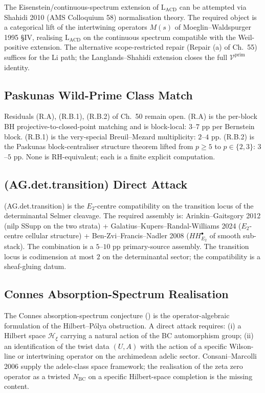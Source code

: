 The Eisenstein/continuous-spectrum extension of
\(\mathrm{L}_{\mathrm{ACD}}\) can be attempted via
Shahidi 2010 (AMS Colloquium 58) normalisation theory. The
required object is a categorical lift of the intertwining operators
\(M(s)\) of Moeglin--Waldspurger 1995 \S IV, realising
\(\mathrm{L}_{\mathrm{ACD}}\) on the continuous spectrum compatible
with the Weil-positive extension. The alternative scope-restricted
repair (Repair (a) of Ch.~55) suffices for the Li path; the
Langlands--Shahidi extension closes the full
\(\mathcal{V}^{\mathrm{prim}}\) identity.

\subsection{Paskunas Wild-Prime Class Match}
\label{v4-arith:w5-synth:paskunas-wild}

Residuals (R.A), (R.B.1), (R.B.2) of Ch.~50 remain open. (R.A) is
the per-block BH projective-to-closed-point matching and is
block-local: \(3\)--\(7\) pp per Bernstein block. (R.B.1) is the
very-special Breuil--Mezard multiplicity: \(2\)--\(4\) pp. (R.B.2) is
the Paskunas block-centraliser structure theorem lifted from
\(p\geq 5\) to \(p\in\{2,3\}\): \(3\)--\(5\) pp. None is RH-equivalent;
each is a finite explicit computation.

\subsection{(AG.det.transition) Direct Attack}
\label{v4-arith:w5-synth:AG-det-transition}

(AG.det.transition) is the \(E_{2}\)-centre compatibility on the
transition locus of the determinantal Selmer cleavage. The required
assembly is: Arinkin--Gaitsgory 2012 (nilp SSupp on the two strata) +
Galatius--Kupers--Randal-Williams 2024 (\(E_{2}\)-centre cellular
structure) + Ben-Zvi--Francis--Nadler 2008 (\(HH^{\bullet}_{E_{2}}\)
of smooth sub-stack). The combination is a \(5\)--\(10\) pp
primary-source assembly. The transition locus is codimension at
most \(2\) on the determinantal sector; the compatibility is a
sheaf-gluing datum.

\subsection{Connes Absorption-Spectrum Realisation}
\label{v4-arith:w5-synth:connes-absorption}

The Connes absorption-spectrum conjecture
() is the operator-algebraic
formulation of the Hilbert--P\'olya obstruction. A direct attack
requires: (i) a Hilbert space \(\mathcal{H}_{\xi}\) carrying a natural
action of the BC automorphism group; (ii) an identification of the
twist data \((U,A)\) with the action of a specific Wilson-line or
intertwining operator on the archimedean adelic sector.
Consani--Marcolli 2006 supply the adele-class space framework; the
realisation of the zeta zero operator as a twisted \(N_{\mathrm{BC}}\)
on a specific Hilbert-space completion is the missing content.

